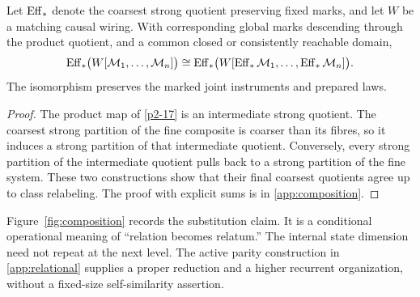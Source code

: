\begin{corollary}\label{p2-18}
Let \(\operatorname{Eff}_{*}\) denote the coarsest strong quotient preserving fixed marks, and let \(W\) be a matching causal wiring. With corresponding global marks descending through the product quotient, and a common closed or consistently reachable domain,
\begin{equation}\label{eq:min-composition}
 \operatorname{Eff}_{*}\bigl(W[\mathcal M_1,\ldots,\mathcal M_n]\bigr)
 \cong
 \operatorname{Eff}_{*}\bigl(W[\operatorname{Eff}_{*}\mathcal M_1,\ldots,\operatorname{Eff}_{*}\mathcal M_n]\bigr).
\end{equation}
The isomorphism preserves the marked joint instruments and prepared laws.
\end{corollary}
\begin{proof}
The product map of \cref{p2-17} is an intermediate strong quotient. The coarsest strong partition of the fine composite is coarser than its fibres, so it induces a strong partition of that intermediate quotient. Conversely, every strong partition of the intermediate quotient pulls back to a strong partition of the fine system. These two constructions show that their final coarsest quotients agree up to class relabeling. The proof with explicit sums is in \cref{app:composition}.
\end{proof}
Figure~\ref{fig:composition} records the substitution claim. It is a conditional operational meaning of ``relation becomes relatum.'' The internal state dimension need not repeat at the next level. The active parity construction in \cref{app:relational} supplies a proper reduction and a higher recurrent organization, without a fixed-size self-similarity assertion.

